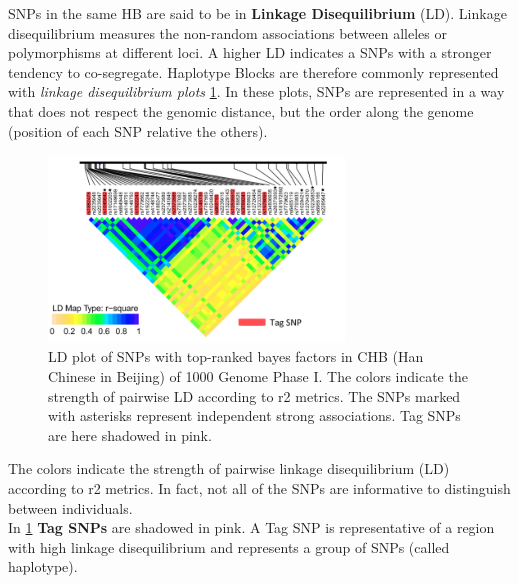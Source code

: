 SNPs in the same HB are said to be in \textbf{Linkage Disequilibrium} (LD). Linkage disequilibrium measures the non-random associations between alleles or polymorphisms at different loci. A higher LD indicates a SNPs with a stronger tendency to co-segregate.
Haplotype Blocks are therefore commonly represented with \emph{linkage disequilibrium plots} \ref{fig:linkage}. In these plots, SNPs are represented in a way that does not respect the genomic distance, but the order along the genome (position of each SNP relative the others).

\begin{figure}[H]
	\centering
	\includegraphics[width=0.7\textwidth]{linkage.png}
	\caption{\label{fig:linkage}LD plot of SNPs with top-ranked bayes factors in CHB (Han Chinese in Beijing) of 1000 Genome Phase I. The colors indicate the
strength of pairwise LD according to r2 metrics. The SNPs marked with asterisks represent independent strong associations. Tag SNPs are here shadowed in pink.}
\end{figure}

The colors indicate the strength of pairwise linkage disequilibrium (LD) according to r2 metrics. In fact, not all of the SNPs are informative to distinguish between individuals. \\
In \ref{fig:linkage} \textbf{Tag SNPs} are shadowed in pink. A Tag SNP is representative of a region with high linkage disequilibrium and represents a group of SNPs (called haplotype).

